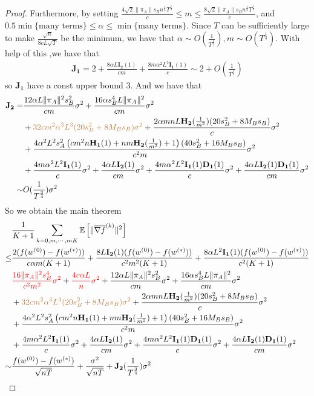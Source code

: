 \documentclass{article}
\newcommand{\EE}[1]{\mathbb{E}\left[#1\right]}
\newcommand{\norm}[1]{\| #1 \|}
\begin{document}
\begin{proof}
  Furthermore, by setting $\frac{4\sqrt{2}\norm{\pi_A}s_Bn^{\frac{1}{4}}T^{\frac{1}{4}}}{c}\leq m \leq \frac{8\sqrt{2}\norm{\pi_A}s_Bn^{\frac{1}{4}}T^{\frac{1}{4}}}{c}$, and $0.5\min\{\text{many terms}\}\leq \alpha \leq \min\{\text{many terms}\}$. Since $T$ can be sufficiently large to make $\frac{\sqrt{n}}{8cL\sqrt{T}}$ be the minimum, we have that $\alpha \sim O(\frac{1}{T^{\frac{1}{2}}}), m\sim O(T^{\frac{1}{4}})$. With help of this ,we have that 
  \begin{align*}
    \mathbf{J_1}=2+\frac{8\alpha L\mathbf{I_2}(1)}{c m}+\frac{8m\alpha^2 L^2\mathbf{I_1}(1)}{c}\sim 2+O(\frac{1}{T^{\frac{1}{4}}})
  \end{align*}
  so $\mathbf{J_1}$ have a const upper bound $3$. And we have that 
  \begin{align*}
    \mathbf{J_2}=&\frac{12\alpha L\norm{\pi_A}^2s_B^2}{cm}\sigma^2+\frac{16\alpha s_B^4L\norm{\pi_A}^2}{cm}\sigma^2\\&+\textcolor{brown}{32cm^2\alpha^3L^3(20s_B^2+8M_Bs_B)\sigma^2}+\frac{2\alpha mnL \mathbf{H_2}(\frac{1}{m^2})(20s_B^2+8M_Bs_B)}{c}\sigma^2\\ &+\frac{4\alpha^2 L^2s_A^2\left(cm^2n\mathbf{H_1}(1)+nm\mathbf{H_2}(\frac{1}{m^2})+1\right)(40s_B^2+16M_Bs_B)}{c^2m}\sigma^2\\&+\frac{4m\alpha^2L^2\mathbf{I_1}(1)}{c}\sigma^2+\frac{4\alpha L\mathbf{I_2}(1)}{cm}\sigma^2
    +\frac{4m\alpha^2L^2\mathbf{I_1}(1)\mathbf{D_1}(1)}{c}\sigma^2
    +\frac{4\alpha L\mathbf{I_2}(1)\mathbf{D_1}(1)}{cm}\sigma^2\\ \sim& O(\frac{1}{T^{\frac{3}{4}}})\sigma^2 
  \end{align*}
  So we obtain the main theorem
  \begin{align*}
    &\frac{1 }{K+1}\sum_{k=0,m,\cdots,mK}\EE{\norm{\overline{\nabla f}^{(k)}}^2}
  \\\leq& \frac{2(f(w^{(0)})-f(w^{(*)}))}{c\alpha m(K+1)}+\frac{8L\mathbf{I_2}(1)(f(w^{(0)})- f(w^{(*)}))}{c^2m^2(K+1)}+\frac{8\alpha L^2\mathbf{I_1}(1)( f(w^{(0)})- f(w^{(*)}))}{c^2(K+1)}
  \\&\textcolor{red}{\frac{16 \norm{\pi_A}^2s_B^4}{c^2m^2}\sigma^2}+\textcolor{red}{ \frac{4c\alpha L}{n}\sigma^2}+\frac{12\alpha L\norm{\pi_A}^2s_B^2}{cm}\sigma^2+\frac{16\alpha s_B^4L\norm{\pi_A}^2}{cm}\sigma^2\\&+\textcolor{brown}{32cm^2\alpha^3L^3(20s_B^2+8M_Bs_B)\sigma^2}+\frac{2\alpha mnL \mathbf{H_2}(\frac{1}{m^2})(20s_B^2+8M_Bs_B)}{c}\sigma^2\\ &+\frac{4\alpha^2 L^2s_A^2\left(cm^2n\mathbf{H_1}(1)+nm\mathbf{H_2}(\frac{1}{m^2})+1\right)(40s_B^2+16M_Bs_B)}{c^2m}\sigma^2\\&+\frac{4m\alpha^2L^2\mathbf{I_1}(1)}{c}\sigma^2+\frac{4\alpha L\mathbf{I_2}(1)}{cm}\sigma^2
  +\frac{4m\alpha^2L^2\mathbf{I_1}(1)\mathbf{D_1}(1)}{c}\sigma^2
  +\frac{4\alpha L\mathbf{I_2}(1)\mathbf{D_1}(1)}{cm}\sigma^2
  \\\sim & \frac{f(w^{(0)})-f(w^{(*)})}{\sqrt{nT}}+\frac{\sigma^2}{\sqrt{nT}}+\mathbf{J_2}(\frac{1}{T^{\frac{3}{4}}})\sigma^2
  \end{align*}
\end{proof}
\end{document}
